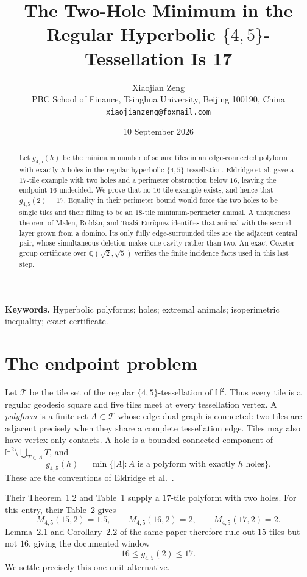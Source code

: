 \documentclass[11pt]{article}
\title{The Two-Hole Minimum in the Regular Hyperbolic
  $\{4,5\}$-Tessellation Is 17}
\author{Xiaojian Zeng\\
  \small PBC School of Finance, Tsinghua University, Beijing 100190, China\\
  \small \texttt{xiaojianzeng@foxmail.com}}
\date{10 September 2026}
\begin{document}
\maketitle

\begin{abstract}
Let $g_{4,5}(h)$ be the minimum number of square tiles in an
edge-connected polyform with exactly $h$ holes in the regular hyperbolic
$\{4,5\}$-tessellation.  Eldridge et al. gave a $17$-tile example with two
holes and a perimeter obstruction below $16$, leaving the endpoint $16$
undecided.  We prove that no $16$-tile example exists, and hence that
$g_{4,5}(2)=17$.  Equality in their perimeter bound would force the two
holes to be single tiles and their filling to be an $18$-tile
minimum-perimeter animal.  A uniqueness theorem of Malen, Rold\'an, and
Toal\'a-Enr\'iquez identifies that animal with the second layer grown from a
domino.  Its only fully edge-surrounded tiles are the adjacent central pair,
whose simultaneous deletion makes one cavity rather than two.  An exact
Coxeter-group certificate over $\mathbb Q(\sqrt2,\sqrt5)$ verifies the finite
incidence facts used in this last step.
\end{abstract}

\noindent\textbf{Keywords.}
Hyperbolic polyforms; holes; extremal animals; isoperimetric inequality;
exact certificate.

\section{The endpoint problem}

Let $\mathcal T$ be the tile set of the regular $\{4,5\}$-tessellation of
$\mathbb H^2$.  Thus every tile is a regular geodesic square and five tiles meet
at every tessellation vertex.  A \emph{polyform} is a finite set
$A\subset\mathcal T$ whose edge-dual graph is connected: two tiles are
adjacent precisely when they share a complete tessellation edge.  Tiles may
also have vertex-only contacts.  A hole is a bounded connected component of
$\mathbb H^2\setminus\bigcup_{T\in A}T$, and
\[
 g_{4,5}(h)=\min\{\lvert A\rvert:A\text{ is a polyform with exactly }h
 \text{ holes}\}.
\]
These are the conventions of Eldridge et al.~\cite{EldridgeEtAl2026}.

Their Theorem~1.2 and Table~1 supply a $17$-tile polyform with two holes.
For this entry, their Table~2 gives
\[
 M_{4,5}(15,2)=1.5,
 \qquad M_{4,5}(16,2)=2,
 \qquad M_{4,5}(17,2)=2.
\]
Lemma~2.1 and Corollary~2.2 of the same paper therefore rule out $15$ tiles
but not $16$, giving the documented window
\[
                 16\le g_{4,5}(2)\le17.
\]
We settle precisely this one-unit alternative.
\end{document}
